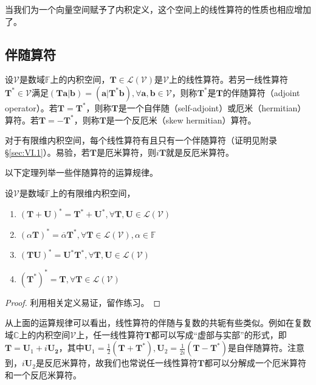 \documentclass[main.tex]{subfiles}
\begin{document}
当我们为一个向量空间赋予了内积定义，这个空间上的线性算符的性质也相应增加了。

\subsection{伴随算符}
\begin{definition}[伴随算符]\label{def:II.6.1}
设$\mathcal{V}$是数域$\mathbb{F}$上的内积空间，$\mathbf{T}\in\mathcal{L}\left(\mathcal{V}\right)$是$\mathcal{V}$上的线性算符。若另一线性算符$\mathbf{T}^*\in\mathcal{V}$满足$\left(\mathbf{Ta}|\mathbf{b}\right)=\left(\mathbf{a}|\mathbf{T}^*\mathbf{b}\right),\forall\mathbf{a},\mathbf{b}\in\mathcal{V}$，则称$\mathbf{T}^*$是$\mathbf{T}$的伴随算符（adjoint operator）。若$\mathbf{T}=\mathbf{T}^*$，则称$\mathbf{T}$是一个自伴随（self-adjoint）或厄米（hermitian）算符。若$\mathbf{T}=-\mathbf{T}^*$，则称$\mathbf{T}$是一个反厄米（skew hermitian）算符。
\end{definition}

对于有限维内积空间，每个线性算符有且只有一个伴随算符（证明见附录\S\ref{sec:VI.1}）。易验，若$\mathbf{T}$是厄米算符，则$i\mathbf{T}$就是反厄米算符。

以下定理列举一些伴随算符的运算规律。

\begin{theorem}\label{thm:II.6.1}
设$\mathcal{V}$是数域$\mathbb{F}$上的有限维内积空间，
\begin{enumerate}
    \item $\left(\mathbf{T}+\mathbf{U}\right)^*=\mathbf{T}^*+\mathbf{U}^*,\forall\mathbf{T},\mathbf{U}\in\mathcal{L}\left(\mathcal{V}\right)$
    \item $\left(\alpha\mathbf{T}\right)^*=\overline{\alpha}\mathbf{T}^*,\forall\mathbf{T}\in\mathcal{L}\left(\mathcal{V}\right),\alpha\in\mathbb{F}$
    \item $\left(\mathbf{TU}\right)^*=\mathbf{U}^*\mathbf{T}^*,\forall\mathbf{T},\mathbf{U}\in\mathcal{L}\left(\mathcal{V}\right)$
    \item $\left(\mathbf{T}^*\right)^*=\mathbf{T},\forall\mathbf{T}\in\mathcal{L}\left(\mathcal{V}\right)$
\end{enumerate}
\end{theorem}
\begin{proof}
利用相关定义易证，留作练习。
\end{proof}

从上面的运算规律可以看出，线性算符的伴随与复数的共轭有些类似。例如在复数域$\mathbb{C}$上的内积空间$\mathcal{V}$上，任一线性算符$\mathbf{T}$都可以写成“虚部与实部”的形式，即$\mathbf{T}=\mathbf{U}_1+i\mathbf{U_2}$，其中$\mathbf{U}_1=\frac{1}{2}\left(\mathbf{T}+\mathbf{T}^*\right),\mathbf{U}_2=\frac{1}{2i}\left(\mathbf{T}-\mathbf{T}^*\right)$是自伴随算符。注意到，$i\mathbf{U}_2$是反厄米算符，故我们也常说任一线性算符$\mathbf{T}$都可以分解成一个厄米算符和一个反厄米算符。
\end{document}
